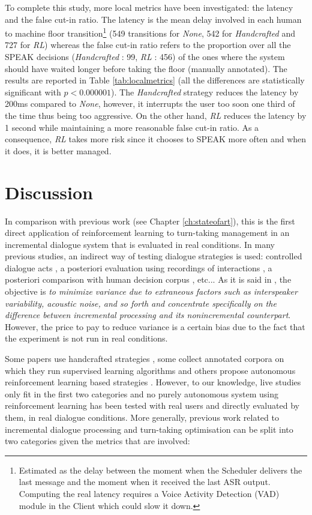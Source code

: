         To complete this study, more local metrics have been investigated: the latency and the false cut-in ratio. The latency is the mean delay involved in each human to machine floor transition\footnote{Estimated as the delay between the moment when the Scheduler delivers the last message and the moment when it received the last ASR output. Computing the real latency requires a Voice Activity Detection (VAD) module in the Client which could slow it down.} (549 transitions for \textit{None}, 542 for \textit{Handcrafted} and 727 for \textit{RL}) whereas the false cut-in ratio refers to the proportion over all the SPEAK decisions (\textit{Handcrafted} : 99, \textit{RL} : 456) of the ones where the system should have waited longer before taking the floor (manually annotated). The results are reported in Table \ref{tab:localmetrics} (all the differences are statistically significant with $p < 0.000001$). The \textit{Handcrafted} strategy reduces the latency by 200ms compared to \textit{None}, however, it interrupts the user too soon one third of the time thus being too aggressive. On the other hand, \textit{RL} reduces the latency by 1 second while maintaining a more reasonable false cut-in ratio. As a consequence, \textit{RL} takes more risk since it chooses to SPEAK more often and when it does, it is better managed.

\section{Discussion}

        In comparison with previous work (see Chapter \ref{ch:stateofart}), this is the first direct application of reinforcement learning to turn-taking management in an incremental dialogue system that is evaluated in real conditions. In many previous studies, an indirect way of testing dialogue strategies is used: controlled dialogue acts \cite{Aist2007}, a posteriori evaluation using recordings of interactions \cite{Meena2013}, a posteriori comparison with human decision corpus \cite{Jonsdottir2008,Dethlefs2012}, etc... As it is said in \cite{Aist2007}, the objective is \textit{to minimize variance due to extraneous factors such as interspeaker variability, acoustic noise, and so forth and concentrate specifically on the difference between incremental processing and its nonincremental counterpart}. However, the price to pay to reduce variance is a certain bias due to the fact that the experiment is not run in real conditions.

        Some papers use handcrafted strategies \cite{Raux2009,Ghigi2014}, some collect annotated corpora on which they run supervised learning algorithms \cite{Meena2013} and others propose autonomous reinforcement learning based strategies \cite{Jonsdottir2008,Selfridge2010,Dethlefs2012}. However, to our knowledge, live studies only fit in the first two categories and no purely autonomous system using reinforcement learning has been tested with real users and directly evaluated by them, in real dialogue conditions. More generally, previous work related to incremental dialogue processing and turn-taking optimisation can be split into two categories given the metrics that are involved:

